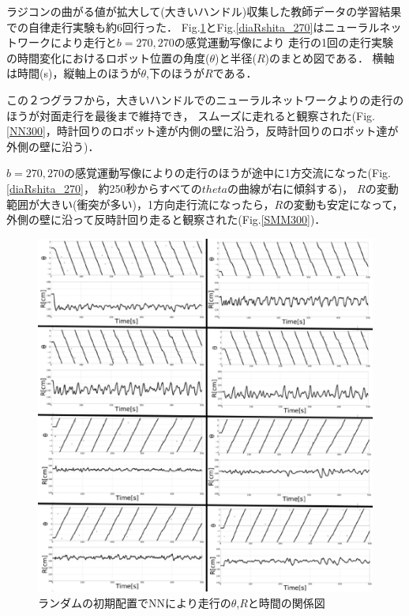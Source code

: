 
ラジコンの曲がる値が拡大して(大きいハンドル)収集した教師データの学習結果での自律走行実験も約6回行った．
Fig.\ref{diaRshita}とFig.\ref{diaRshita_270}はニューラルネットワークにより走行と$b=270,270$の感覚運動写像により
走行の1回の走行実験の時間変化におけるロボット位置の角度($\theta$)と半径($R$)のまとめ図である．
横軸は時間(s)，縦軸上のほうが$\theta$,下のほうが$R$である．

この２つグラフから，大きいハンドルでのニューラルネットワークよりの走行のほうが対面走行を最後まで維持でき，
スムーズに走れると観察された(Fig.\ref{NN300}，時計回りのロボット達が内側の壁に沿う，反時計回りのロボット達が外側の壁に沿う)．

$b=270,270$の感覚運動写像によりの走行のほうが途中に1方交流になった(Fig.\ref{diaRshita_270}，
約250秒からすべての$theta$の曲線が右に傾斜する)，
$R$の変動範囲が大きい(衝突が多い)，1方向走行流になったら，$R$の変動も安定になって，
外側の壁に沿って反時計回り走ると観察された(Fig.\ref{SMM300})．


\vspace{-1mm}
\begin{figure}[!ht]
    \centering
    \includegraphics[width=1.0\linewidth]{nn_shita_R_rand.eps}
    \caption{ランダムの初期配置でNNにより走行の$\theta$,$R$と時間の関係図}
    \label{diaRshita}
\end{figure}

